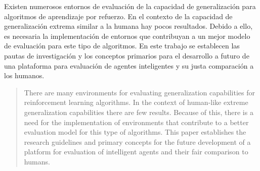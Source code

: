 \begin{resumen}
    Existen numerosos entornos de evaluación de la capacidad de generalización para algoritmos de aprendizaje por refuerzo. En el contexto de la capacidad de generalización extrema similar a la humana hay pocos resultados. Debido a ello, es necesaria la implementación de entornos que contribuyan a un mejor modelo de evaluación para este tipo de algoritmos. En este trabajo se establecen las pautas de investigación y los conceptos primarios para el desarrollo a futuro de una plataforma para evaluación de agentes inteligentes y su justa comparación a los humanos.
\end{resumen}

\begin{abstract}
	There are many environments for evaluating generalization capabilities for reinforcement learning algorithms. In the context of human-like extreme generalization capabilities there are few results. Because of this, there is a need for the implementation of environments that contribute to a better evaluation model for this type of algorithms. This paper establishes the research guidelines and primary concepts for the future development of a platform for evaluation of intelligent agents and their fair comparison to humans.
\end{abstract}